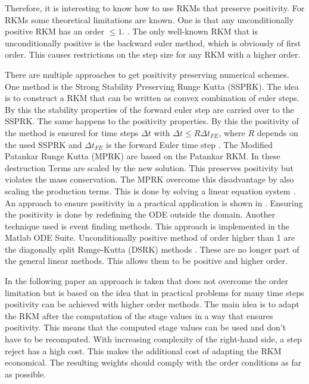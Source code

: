 \documentclass[a4paper]{scrartcl}
\numberwithin{equation}{section}
\theoremstyle{plain}
\theoremstyle{definition}
\numberwithin{theorem}{section}
\newcommand{\dt}{{\Delta t}}
\newcommand{\1}{\mathbbm{1}}
\begin{document}
Therefore, it is interesting to know how to use RKMs that preserve positivity.
For RKMs some theoretical limitations are known. One is that any unconditionally positive RKM has an order $\leq 1$. \cite{hundsdorfer_numerical_2003,bolley_conservation_1978,horvath_positivity_1998}. The only well-known RKM that is unconditionally positive is the backward euler method, which is obviously of first order. 
This causes restrictions on the step size for any RKM with a higher order.

There are multiple approaches to get positivity preserving numerical schemes.
One method is the Strong Stability Preserving Runge Kutta (SSPRK). 
The idea is to construct a RKM that can be written as convex combination of euler steps. 
By this the stability properties of the forward euler step are carried over to the SSPRK.
The same happens to the positivity properties. By this the positivity of the method is ensured for time steps $\dt$ with $\dt \leq R \dt_{FE}$, where $R$ depends on the used SSPRK and $\dt_{FE}$ is the forward Euler time step \cite{gottlieb_strong_2011}. 
The Modified Patankar Runge Kutta (MPRK) are 
based on the Patankar RKM. In these destruction Terms are scaled by the new solution. This preserves positivity but violates the mass conservation. The MPRK overcome this disadvantage by also scaling the production terms. This is done by solving a linear equation system \cite{kopecz_comparison_2019}.
An approach to ensure positivity in a practical application is shown in \cite{shampine_non-negative_2005}. Ensuring the positivity is done by redefining the ODE outside the domain. Another technique used is event finding methods. This approach is implemented in the Matlab ODE Suite.
Unconditionally positive method of order higher than 1 are the diagonally split Runge-Kutta (DSRK) methods \cite{horvath_positivity_1998}. These are no longer part of the general linear methods. This allows them to be positive and higher order. 

In the following paper an approach is taken that does not overcome the order limitation but is based on the idea that in practical problems for many time steps positivity can be achieved with higher order methods.
The main idea is to adapt the RKM after the computation of the stage values in a way that ensures positivity.  
This means that the computed stage values can be used and don't have to be recomputed. With increasing complexity of the right-hand side, a step reject has a high cost. This makes the additional cost of adapting the RKM economical.
The resulting weights should comply with the order conditions as far as possible.
\end{document}
